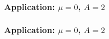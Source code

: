 \documentclass{beamer}
\begin{document}
\begin{frame}
\frametitle{Application: $\mu = 0$, $A = 2$}

\begin{figure}
\label{pic:diagram_ex1}
\end{figure}

\end{frame}


\begin{frame}
\frametitle{Application: $\mu = 0$, $A = 2$}

\begin{figure}
\label{pic:diagram_ex2}
\end{figure}

\end{frame}
\end{document}

